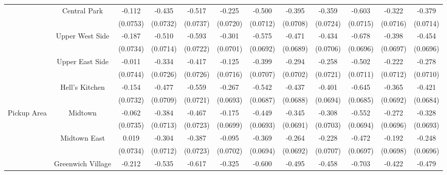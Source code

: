 \begin{landscape}
\begin{table}[h]
{\begin{center}
{\begin{tabular}{l*{11}{c}}
\hline
&\multicolumn{1}{c}{Central Park}      &   -0.112 & -0.435\sym{***} & -0.517\sym{***} & -0.225\sym{**} & -0.500\sym{***} & -0.395\sym{***} & -0.359\sym{***} & -0.603\sym{***} & -0.322\sym{***} & -0.379\sym{***}\\
&& (0.0753)& (0.0732)& (0.0737)& (0.0720)& (0.0712)& (0.0708)& (0.0724)& (0.0715)& (0.0716)& (0.0714)\\
&\multicolumn{1}{c}{Upper West Side} &   -0.187\sym{*} & -0.510\sym{***} & -0.593\sym{***} & -0.301\sym{***}& -0.575\sym{***}& -0.471\sym{***}& -0.434\sym{***}& -0.678\sym{***}& -0.398\sym{***}& -0.454\sym{***}\\
&& (0.0734)& (0.0714)& (0.0722)& (0.0701)& (0.0692)& (0.0689)& (0.0706)& (0.0696)& (0.0697)& (0.0696) \\
&\multicolumn{1}{c}{Upper East Side} &  -0.011&	-0.334\sym{***}&	-0.417\sym{***}&  -0.125& -0.399\sym{***}& -0.294\sym{***}& -0.258\sym{***}& -0.502\sym{***}& -0.222\sym{**}& -0.278\sym{***}\\
&& (0.0744)& (0.0726)& (0.0726)& (0.0716)& (0.0707)& (0.0702)& (0.0721)& (0.0711)& (0.0712)& (0.0710)\\
&\multicolumn{1}{c}{Hell's Kitchen} &  -0.154\sym{*}&	-0.477\sym{***}&	-0.559\sym{***}&	-0.267\sym{***}& -0.542\sym{***}&  -0.437\sym{***}& -0.401\sym{***}& -0.645\sym{***}& -0.365\sym{***}& -0.421\sym{***}\\
&& (0.0732)& (0.0709)& (0.0721)& (0.0693)& (0.0687)& (0.0688)& (0.0694)&  (0.0685)& (0.0692) &(0.0684)\\
\multicolumn{1}{l}{Pickup Area} & \multicolumn{1}{c}{Midtown} &  -0.062&	-0.384\sym{***}&	-0.467\sym{***}&	-0.175\sym{*}&	-0.449\sym{***}& -0.345\sym{***}& -0.308\sym{***}&  -0.552\sym{***}& -0.272\sym{***}& -0.328\sym{***}\\
&& (0.0735)& (0.0713)& (0.0723)& (0.0699)& (0.0693)& (0.0691)& (0.0703)& (0.0694)& (0.0696)& (0.0693)\\
&\multicolumn{1}{c}{Midtown East} &  0.019&	-0.304\sym{***}&	-0.387\sym{***}&	-0.095&	-0.369\sym{***}&	-0.264\sym{***}& -0.228\sym{**}& -0.472\sym{***}& -0.192\sym{**}& -0.248\sym{***}\\
&& (0.0734)& (0.0712)& (0.0723)& (0.0702)& (0.0694)& (0.0692)& (0.0707)& (0.0697)& (0.0698)& (0.0696)\\
&\multicolumn{1}{c}{Greenwich Village} &  -0.212\sym{**}&	-0.535\sym{***}&	-0.617\sym{***}&	-0.325\sym{***}&	-0.600\sym{***}&	-0.495\sym{***}&	-0.458\sym{***}&  -0.703\sym{***}& -0.422\sym{***}& -0.479\sym{***}\\

\end{tabular}}
\end{center}}
\end{table}
\end{landscape}
